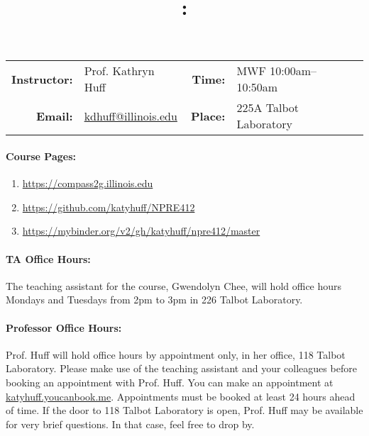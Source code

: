 \documentclass[11pt, a4paper]{article}
\title{\CourseNumber: \CourseTitle\\}
\author{\CourseUniversity}
\date{\CourseSemester \CourseYear}
\makeatletter
\newcommand{\CourseNumber}{NPRE412}
\newcommand{\CourseInstructor}{Prof. Kathryn Huff\xspace}%
\newcommand{\CourseDays}{MWF\xspace}%
\newcommand{\CourseStart}{10:00am\xspace}%
\newcommand{\CourseEnd}{10:50am\xspace}%
\newcommand{\CourseInstructorEmail}{kdhuff@illinois.edu}
\newcommand{\HuffOfficeHourPlace}{118 Talbot Laboratory\xspace}
\newcommand{\CourseRoom}{225A\xspace}%
\newcommand{\CourseBuilding}{Talbot Laboratory\xspace}%
\newcommand{\TeachingAssistant}{Gwendolyn Chee\xspace}%
\newcommand{\TAOfficeHourDays}{Mondays and Tuesdays\xspace}%
\newcommand{\TAOfficeHourStart}{2pm\xspace}%
\newcommand{\TAOfficeHourEnd}{3pm\xspace}%
\newcommand{\TAOfficeHourPlace}{226 Talbot Laboratory\xspace}
\makeatother
\begin{document}
\maketitle
\renewcommand{\arraystretch}{1.5}
\begin{center}
\begin{table}[h]
\begin{tabularx}{\textwidth}{rXrX}
\hline
\textbf{Instructor:} & \CourseInstructor & \textbf{Time:} & \CourseDays \CourseStart -- \CourseEnd \\
\textbf{Email:} &  \href{mailto:\CourseInstructorEmail}{\CourseInstructorEmail} & \textbf{Place:} & \CourseRoom \CourseBuilding\\
\hline
\end{tabularx}
\end{table}
\end{center}

\paragraph{Course Pages:}
\begin{enumerate}
        \item \url{https://compass2g.illinois.edu}
        \item \url{https://github.com/katyhuff/\CourseNumber}
        \item \url{https://mybinder.org/v2/gh/katyhuff/npre412/master}
\end{enumerate}

\paragraph{TA Office Hours:} The teaching assistant for the course, 
\TeachingAssistant, will hold office hours \TAOfficeHourDays from 
\TAOfficeHourStart to \TAOfficeHourEnd in \TAOfficeHourPlace.



\paragraph{Professor Office Hours:} Prof. Huff will hold office hours by appointment
only, in her office, \HuffOfficeHourPlace. Please make use of the teaching
assistant and your colleagues before booking an appointment with Prof. Huff.
You can make an appointment at \url{katyhuff.youcanbook.me}. Appointments 
must be booked at least 24 hours ahead of time.
If the door to \HuffOfficeHourPlace is open, Prof. Huff may be available for very brief 
questions. In that case, feel free to drop by.
\end{document}
